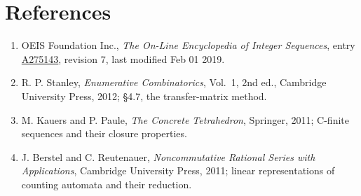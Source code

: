 \documentclass[11pt]{article}
\theoremstyle{definition}
\begin{document}
\section{References}

\begin{enumerate}

\item OEIS Foundation Inc., \emph{The On-Line Encyclopedia of Integer Sequences}, entry \href{https://oeis.org/A275143}{A275143}, revision 7, last modified Feb 01 2019.

\item R. P. Stanley, \emph{Enumerative Combinatorics}, Vol.~1, 2nd ed., Cambridge University Press, 2012; \S4.7, the transfer-matrix method.

\item M. Kauers and P. Paule, \emph{The Concrete Tetrahedron}, Springer, 2011; C-finite sequences and their closure properties.

\item J. Berstel and C. Reutenauer, \emph{Noncommutative Rational Series with Applications}, Cambridge University Press, 2011; linear representations of counting automata and their reduction.

\end{enumerate}
\end{document}
